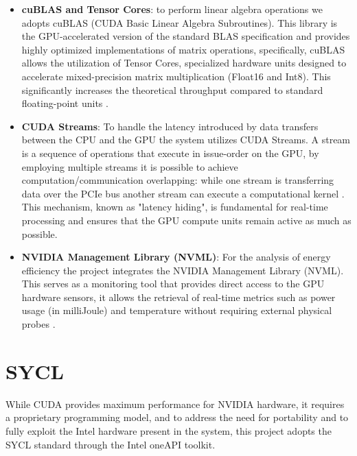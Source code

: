 \begin{itemize}
    \item \textbf{cuBLAS and Tensor Cores}: to perform linear algebra operations we adopts cuBLAS (CUDA Basic Linear Algebra Subroutines). This library is the GPU-accelerated version of the standard BLAS specification and provides highly optimized implementations of matrix operations, specifically, cuBLAS allows the utilization of Tensor Cores, specialized hardware units designed to accelerate mixed-precision matrix multiplication (Float16 and Int8). This significantly increases the theoretical throughput compared to standard floating-point units \cite{cublas}.

    \item \textbf{CUDA Streams}: To handle the latency introduced by data transfers between the CPU and the GPU the system utilizes CUDA Streams. A stream is a sequence of operations that execute in issue-order on the GPU, by employing multiple streams it is possible to achieve computation/communication overlapping: while one stream is transferring data over the PCIe bus another stream can execute a computational kernel \cite{cuda_streams}. This mechanism, known as "latency hiding", is fundamental for real-time processing and ensures that the GPU compute units remain active as much as possible.

    \item \textbf{NVIDIA Management Library (NVML)}: For the analysis of energy efficiency the project integrates the NVIDIA Management Library (NVML). This serves as a monitoring tool that provides direct access to the GPU hardware sensors, it allows the retrieval of real-time metrics such as power usage (in milliJoule) and temperature without requiring external physical probes \cite{nvml}.
\end{itemize}

\clearpage

\section{SYCL}
\label{sycl}

While CUDA provides maximum performance for NVIDIA hardware, it requires a proprietary programming model, and to address the need for portability and to fully exploit the Intel hardware present in the system, this project adopts the SYCL standard through the Intel oneAPI toolkit.

